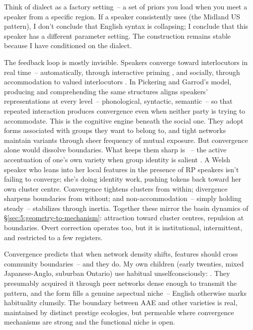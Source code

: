Think of dialect as a factory setting~-- a set of priors you load when you meet a speaker from a specific region. If a speaker consistently uses  (the Midland US pattern), I don't conclude that English syntax is collapsing; I conclude that this speaker has a different parameter setting. The construction remains stable because I have conditioned on the dialect.

The feedback loop is mostly invisible. Speakers converge toward interlocutors in real time~-- automatically, through interactive priming \citep{pickering2004}, and socially, through accommodation to valued interlocutors \citep{giles1991}. In Pickering and Garrod's model, producing and comprehending the same structures aligns speakers' representations at every level~-- phonological, syntactic, semantic~-- so that repeated interaction produces convergence even when neither party is trying to accommodate. This is the cognitive engine beneath the social one. They adopt forms associated with groups they want to belong to, and tight networks maintain variants through sheer frequency of mutual exposure. But convergence alone would dissolve boundaries. What keeps them sharp is ~-- the active accentuation of one's own variety when group identity is salient \citep{gallois2005}. A Welsh speaker who leans into her local features in the presence of RP speakers isn't failing to converge; she's doing identity work, pushing tokens back toward her own cluster centre. Convergence tightens clusters from within; divergence sharpens boundaries from without; and non-accommodation~-- simply holding steady~-- stabilizes through inertia. Together these mirror the basin dynamics of §\ref{sec:5:geometry-to-mechanism}: attraction toward cluster centres, repulsion at boundaries. Overt correction operates too, but it is institutional, intermittent, and restricted to a few registers.

Convergence predicts that when network density shifts, features should cross community boundaries~-- and they do. My own children (early twenties, mixed Japanese-Anglo, suburban Ontario) use habitual  unselfconsciously: . They presumably acquired it through peer networks dense enough to transmit the pattern, and the form fills a genuine aspectual niche~-- English otherwise marks habituality clumsily. The boundary between AAE and other varieties is real, maintained by distinct prestige ecologies, but permeable where convergence mechanisms are strong and the functional niche is open.

